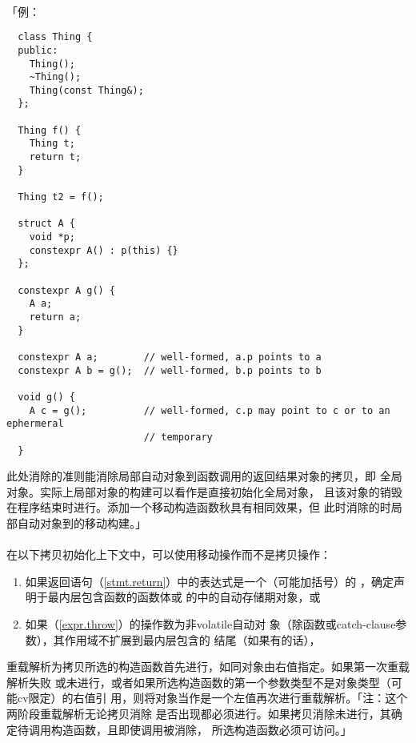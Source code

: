 \paragraph{}
「例：
\begin{lstlisting}
  class Thing {
  public:
    Thing();
    ~Thing();
    Thing(const Thing&);
  };

  Thing f() {
    Thing t;
    return t;
  }

  Thing t2 = f();

  struct A {
    void *p;
    constexpr A() : p(this) {}
  };

  constexpr A g() {
    A a;
    return a;
  }

  constexpr A a;        // well-formed, a.p points to a
  constexpr A b = g();  // well-formed, b.p points to b

  void g() {
    A c = g();          // well-formed, c.p may point to c or to an ephermeral
                        // temporary
  }
\end{lstlisting}
此处消除的准则能消除局部自动对象到函数调用的返回结果对象的拷贝，即
全局对象。实际上局部对象的构建可以看作是直接初始化全局对象，
且该对象的销毁在程序结束时进行。添加一个移动构造函数秋具有相同效果，但
此时消除的时局部自动对象到的移动构建。」

\paragraph{}
在以下拷贝初始化上下文中，可以使用移动操作而不是拷贝操作：
\begin{enumerate}
  \item{如果返回语句（\ref{stmt.return}）中的表达式是一个（可能加括号）的
    ，确定声明于最内层包含函数的函数体或
    的中的自动存储期对象，或}
  \item{如果（\ref{expr.throw}）的操作数为非volatile自动对
    象（除函数或catch-clause参数），其作用域不扩展到最内层包含的
    结尾（如果有的话），}
\end{enumerate}
重载解析为拷贝所选的构造函数首先进行，如同对象由右值指定。如果第一次重载解析失败
或未进行，或者如果所选构造函数的第一个参数类型不是对象类型（可能cv限定）的右值引
用，则将对象当作是一个左值再次进行重载解析。「注：这个两阶段重载解析无论拷贝消除
是否出现都必须进行。如果拷贝消除未进行，其确定待调用构造函数，且即使调用被消除，
所选构造函数必须可访问。」

